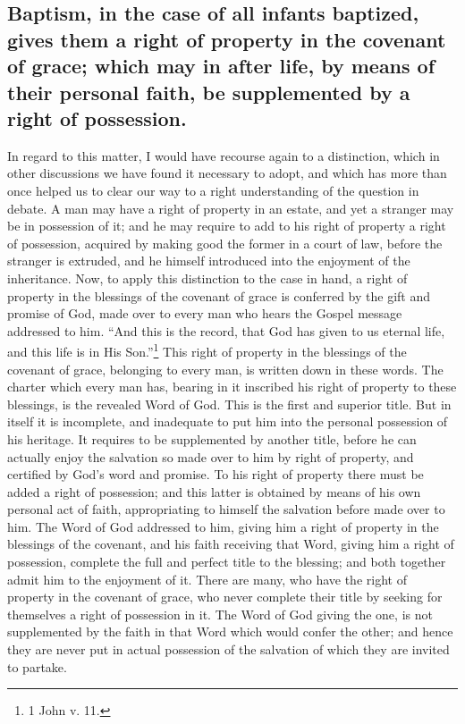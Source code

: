 \documentclass[english,]{book}
\begin{document}
\hypertarget{baptism-in-the-case-of-all-infants-baptized-gives-them-a-right-of-property-in-the-covenant-of-grace-which-may-in-after-life-by-means-of-their-personal-faith-be-supplemented-by-a-right-of-possession.}{%
\subsection{Baptism, in the case of all infants baptized, gives them a right of property in the covenant of grace; which may in after life, by means of their personal faith, be supplemented by a right of possession.}\label{baptism-in-the-case-of-all-infants-baptized-gives-them-a-right-of-property-in-the-covenant-of-grace-which-may-in-after-life-by-means-of-their-personal-faith-be-supplemented-by-a-right-of-possession.}}

In regard to this matter, I would have recourse again to a distinction, which in other discussions we have found it necessary to adopt, and which has more than once helped us to clear our way to a right understanding of the question in debate. A man may have a right of property in an estate, and yet a stranger may be in possession of it; and he may require to add to his right of property a right of possession, acquired by making good the former in a court of law, before the stranger is extruded, and he himself introduced into the enjoyment of the inheritance. Now, to apply this distinction to the case in hand, a right of property in the blessings of the covenant of grace is conferred by the gift and promise of God, made over to every man who hears the Gospel message addressed to him. ``And this is the record, that God has given to us eternal life, and this life is in His Son.''\footnote{1 John v. 11.} This right of property in the blessings of the covenant of grace, belonging to every man, is written down in these words. The charter which every man has, bearing in it inscribed his right of property to these blessings, is the revealed Word of God. This is the first and superior title. But in itself it is incomplete, and inadequate to put him into the personal possession of his heritage. It requires to be supplemented by another title, before he can actually enjoy the salvation so made over to him by right of property, and certified by God's word and promise. To his right of property there must be added a right of possession; and this latter is obtained by means of his own personal act of faith, appropriating to himself the salvation before made over to him. The Word of God addressed to him, giving him a right of property in the blessings of the covenant, and his faith receiving that Word, giving him a right of possession, complete the full and perfect title to the blessing; and both together admit him to the enjoyment of it. There are many, who have the right of property in the covenant of grace, who never complete their title by seeking for themselves a right of possession in it. The Word of God giving the one, is not supplemented by the faith in that Word which would confer the other; and hence they are never put in actual possession of the salvation of which they are invited to partake.
\end{document}
